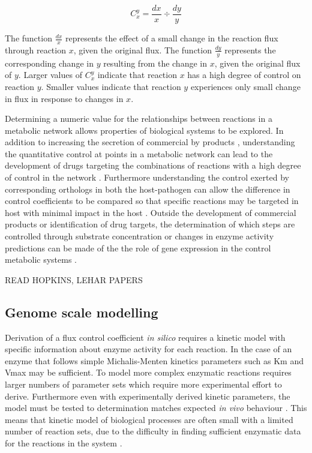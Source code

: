 \begin{equation}\label{fcc}
C_{x}^{y} = \frac{dx}{x}\div\frac{dy}{y}
\end{equation}

The function $\frac{dx}{x}$ represents the effect of a small change in the reaction flux through reaction $x$, given the original flux. The function $\frac{dy}{y}$ represents the corresponding change in $y$ resulting from the change in $x$, given the original flux of $y$. Larger values of $C_{x}^{y}$ indicate that reaction $x$ has a high degree of control on reaction $y$. Smaller values indicate that reaction $y$ experiences only small change in flux in response to changes in $x$.

Determining a numeric value for the relationships between reactions in a metabolic network allows properties of biological systems to be explored. In addition to increasing the secretion of commercial by products \cite{niederberger1992}, understanding the quantitative control at points in a metabolic network can lead to the development of drugs targeting the combinations of reactions with a high degree of control in the network \cite{lehar2008,hopkins2008}. Furthermore understanding the control exerted by corresponding orthologs in both the host-pathogen can allow the difference in control coefficients to be compared so that specific reactions may be targeted in host with minimal impact in the host \cite{hornberg2007}. Outside the development of commercial products or identification of drug targets, the determination of which steps are controlled through substrate concentration or changes in enzyme activity predictions can be made of the the role of gene expression in the control metabolic systems \cite{rossell2006,daran-lapujade2007}.

READ HOPKINS, LEHAR PAPERS

\subsection{Genome scale modelling}

Derivation of a flux control coefficient \emph{in silico} requires a kinetic model with specific information about enzyme activity for each reaction. In the case of an enzyme that follows simple Michalis-Menten kinetics parameters such as Km and Vmax may be sufficient. To model more complex enzymatic reactions requires larger numbers of parameter sets which require more experimental effort to derive. Furthermore even with experimentally derived kinetic parameters, the model must be tested to determination matches expected \emph{in vivo} behaviour \cite{teusink2000}. This means that kinetic model of biological processes are often small with a limited number of reaction sets, due to the difficulty in finding sufficient enzymatic data for the reactions in the system \cite{steuer2007}.


